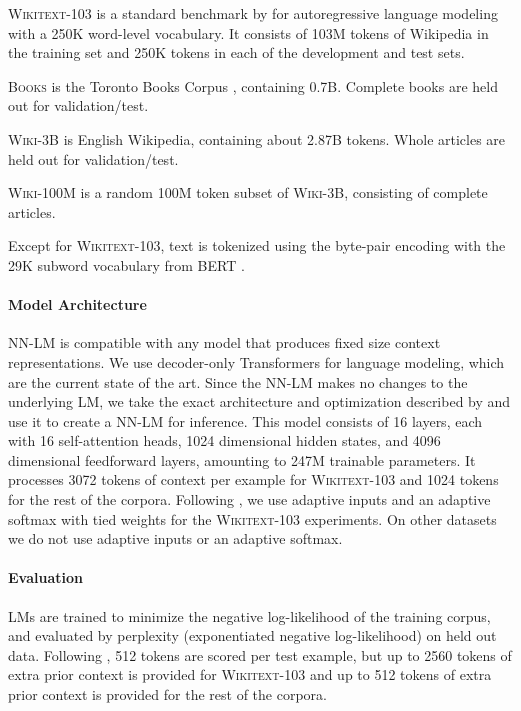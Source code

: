 \documentclass{article} \usepackage{iclr2020_conference,times}
\begin{document}
\textsc{Wikitext-103} is a standard benchmark by \cite{merity2017pointer} for autoregressive language modeling with a 250K word-level vocabulary.
It consists of 103M tokens of Wikipedia in the training set and 250K tokens in each of the development and test sets. 

\textsc{Books} is the Toronto Books Corpus \citep{zhu2015aligning}, containing 0.7B. Complete books are held out for validation/test.

\textsc{Wiki-3B} is English Wikipedia, containing about 2.87B tokens. Whole articles are held out for validation/test.

\textsc{Wiki-100M} is a random 100M token subset of \textsc{Wiki-3B}, consisting of complete articles.






Except for \textsc{Wikitext-103}, text is tokenized using the byte-pair encoding \citep{sennrich2015neural} with the 29K subword vocabulary from BERT \citep{devlin2018bert}.



\paragraph{Model Architecture} NN-LM is compatible with any model that produces fixed size context representations. We use decoder-only Transformers \citep{vaswani2017attention} for language modeling, which are the current state of the art.
Since the NN-LM makes no changes to the underlying LM, we take the exact architecture and optimization described by \citet{baevski2019adaptive} and use it to create a NN-LM for inference.
This model consists of 16 layers, each with 16 self-attention heads, 1024 dimensional hidden states, and 4096 dimensional feedforward layers, amounting to 247M trainable parameters.
It processes 3072 tokens of context per example for \textsc{Wikitext-103} and 1024 tokens for the rest of the corpora.
Following \citet{baevski2019adaptive}, we use adaptive inputs and an adaptive softmax \citep{grave2017efficient} with tied weights \citep{press2016using} for the \textsc{Wikitext-103} experiments. On other datasets we do not use adaptive inputs or an adaptive softmax.


\paragraph{Evaluation}
LMs are trained to minimize the negative log-likelihood of the training corpus,
and evaluated by perplexity (exponentiated negative log-likelihood) on held out data.
Following \citet{baevski2019adaptive}, 512 tokens are scored per test example, but up to 2560 tokens of extra prior context is provided for \textsc{Wikitext-103} and up to 512 tokens of extra prior context is provided for the rest of the corpora.
\end{document}
